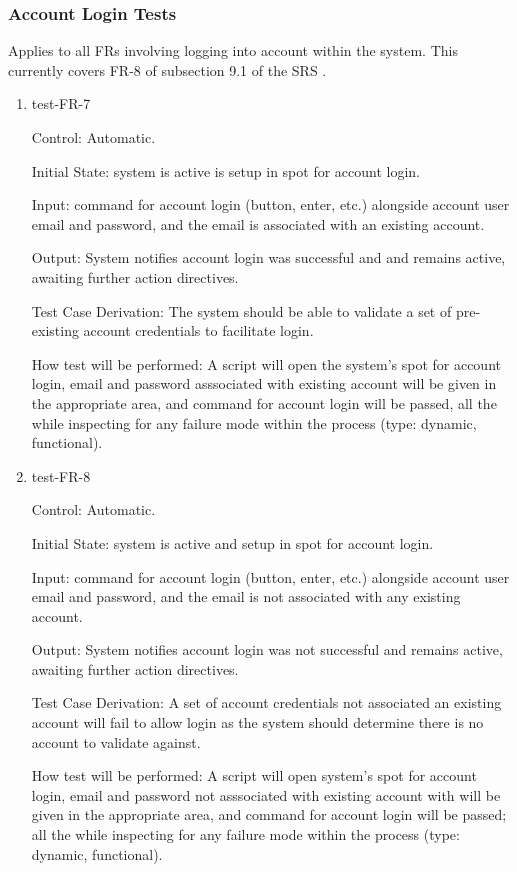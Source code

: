 \documentclass[12pt, titlepage]{article}
\begin{document}
\subsubsection{Account Login Tests}

Applies to all FRs involving logging into account within the system. This 
currently covers FR-8 of subsection 9.1 of the SRS \citep{SRS}.

\begin{enumerate}

\item{test-FR-7\\}

Control: Automatic.
					
Initial State: system is active is setup in spot for account 
login.
					
Input: command for account login (button, enter, etc.) alongside account 
user email and password, and the email is associated with an existing 
account.
					
Output: System notifies account login was successful and and remains 
active, awaiting further action directives.

Test Case Derivation: The system should be able to validate a set of 
pre-existing account credentials to facilitate login.

How test will be performed: A script will open the system's spot for account 
login, email and  password asssociated with existing account will be given 
in the appropriate area, and command for account login will be passed, all 
the while inspecting for any failure mode within the process (type: dynamic, 
functional).

\item{test-FR-8\\}

Control: Automatic.
					
Initial State: system is active and setup in spot for account login.
					
Input: command for account login (button, enter, etc.) alongside account 
user email and password, and the email is not associated with any existing 
account.
					
Output: System notifies account login was not successful and remains 
active, awaiting further action directives.

Test Case Derivation: A set of account credentials not associated an existing 
account will fail to allow login as the system should determine there is no 
account to validate against.

How test will be performed: A script will open system's spot for account login, 
email and password not asssociated with existing account with will be given in 
the appropriate area, and command for account login will be passed; all the 
while inspecting for any failure mode within the process (type: dynamic, functional).
					
\end{enumerate}
\end{document}
